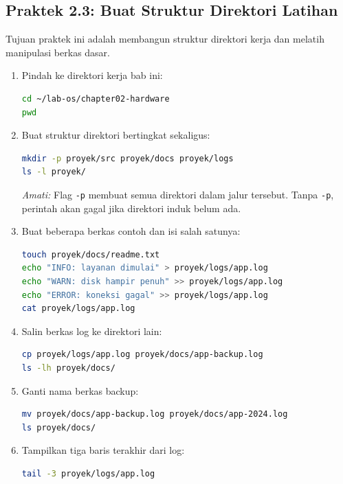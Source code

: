 \subsection*{Praktek 2.3: Buat Struktur Direktori Latihan}

Tujuan praktek ini adalah membangun struktur direktori kerja dan melatih manipulasi berkas dasar.

\begin{enumerate}
    \item Pindah ke direktori kerja bab ini:
\begin{lstlisting}[language=bash, caption={Masuk ke direktori kerja}]
cd ~/lab-os/chapter02-hardware
pwd
\end{lstlisting}

    \item Buat struktur direktori bertingkat sekaligus:
\begin{lstlisting}[language=bash, caption={Membuat struktur direktori}]
mkdir -p proyek/src proyek/docs proyek/logs
ls -l proyek/
\end{lstlisting}
    \textit{Amati:} Flag \texttt{-p} membuat semua direktori dalam jalur tersebut. Tanpa \texttt{-p}, perintah akan gagal jika direktori induk belum ada.

    \item Buat beberapa berkas contoh dan isi salah satunya:
\begin{lstlisting}[language=bash, caption={Membuat dan mengisi berkas}]
touch proyek/docs/readme.txt
echo "INFO: layanan dimulai" > proyek/logs/app.log
echo "WARN: disk hampir penuh" >> proyek/logs/app.log
echo "ERROR: koneksi gagal" >> proyek/logs/app.log
cat proyek/logs/app.log
\end{lstlisting}

    \item Salin berkas log ke direktori lain:
\begin{lstlisting}[language=bash, caption={Menyalin berkas}]
cp proyek/logs/app.log proyek/docs/app-backup.log
ls -lh proyek/docs/
\end{lstlisting}

    \item Ganti nama berkas backup:
\begin{lstlisting}[language=bash, caption={Mengganti nama berkas}]
mv proyek/docs/app-backup.log proyek/docs/app-2024.log
ls proyek/docs/
\end{lstlisting}

    \item Tampilkan tiga baris terakhir dari log:
\begin{lstlisting}[language=bash, caption={Membaca akhir berkas log}]
tail -3 proyek/logs/app.log
\end{lstlisting}
\end{enumerate}


